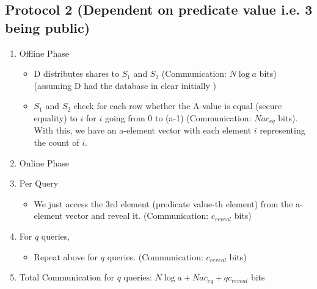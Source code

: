 \subsection{Protocol 2 (Dependent on predicate value i.e. 3 being public)}
\begin{enumerate}
    \item Offline Phase
    \begin{itemize}
        \item D distributes shares to $S_1$ and $S_2$ (Communication: $N\log a$ bits) (assuming D had the database in clear initially
)
        \item $S_1$ and $S_2$ check for each row whether the A-value is equal (secure equality) to $i$ for $i$ going from 0 to (a-1) (Communication: $Nac_{eq}$ bits). With this, we have an a-element vector with each element $i$ representing the count of $i$.
    \end{itemize}
    \item Online Phase
    \item Per Query
    \begin{itemize}
        \item We just access the 3rd element (predicate value-th element) from the a-element vector and reveal it. (Communication: $c_{reveal}$ bits) 
    \end{itemize}
    \item For $q$ queries,
    \begin{itemize}
        \item Repeat above for $q$ queries. (Communication: $c_{reveal}$ bits)
    \end{itemize}
    \item Total Communication for $q$ queries: $N\log a + Nac_{eq} + qc_{reveal}$ bits  
\end{enumerate}

